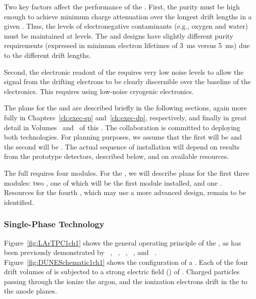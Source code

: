 Two key factors affect the performance of the  .  First, the  purity must be high enough to achieve minimum charge attenuation over the longest drift lengths in a given .  Thus, the levels of electronegative contaminants (e.g., oxygen and water) must be maintained at  levels.  The  and  designs have slightly different purity requirements (expressed in minimum electron lifetimes of \SI{3}{ms} versus \SI{5}{ms}) due to the different drift lengths.

Second, the electronic readout of the  requires very low noise levels to allow the signal from the drifting electrons to be clearly discernible over the baseline of the electronics.  This requires using low-noise cryogenic electronics. 

The plans for the  and   are described briefly in the following sections, again more fully in Chapters~\ref{ch:exec-sp} and~\ref{ch:exec-dp}, respectively, and finally in great detail in Volumes~\volnumbersp{} and~\volnumberdp{} of this . 
The  collaboration is committed to deploying both technologies. 
For planning purposes, we assume that the first  will be
 and the second will be .
The actual sequence of  installation will depend on results from the prototype detectors, described below, and on available resources.

The full   requires four modules. For the , we will describe plans for the first three modules: two , one of which will be the first module installed, and one . Resources for the fourth , which may use a more advanced design, remain to be identified. 

\subsubsection{Single-Phase Technology}
\label{sec:fdsp-exec-splar}

Figure~\ref{fig:LArTPC1ch1} shows the general operating principle of the  , as has been previously demonstrated by  ~\cite{Icarus-T600}, ~\cite{microboone}, ~\cite{Anderson:2012vc}, ~\cite{Cavanna:2014iqa}, and ~\cite{Abi:2017aow}. Figure~\ref{fig:DUNESchematic1ch1} shows the configuration of a  . Each of the four drift volumes of  is subjected to a strong electric field (\efield{}) of \spmaxfield. Charged particles passing through the  ionize the argon, and the ionization electrons drift in the \efield to the anode planes. 


